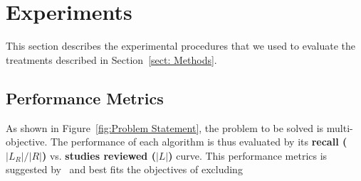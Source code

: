 \documentclass{svjour3}
\theoremstyle{break}
\begin{document}
\section{Experiments}
\label{sect: Experiments}

This section describes the experimental procedures that we used to evaluate the treatments described in Section~\ref{sect: Methods}. 

\subsection{Performance Metrics}
\label{sect: Performance Metrics}

As shown in Figure~\ref{fig:Problem Statement}, the problem to be solved is multi-objective. The performance of each algorithm is thus evaluated by its \textbf{recall ($|L_R|/|R|$)} vs. \textbf{studies reviewed ($|L|$)} curve. This performance metrics is suggested by~\cite{cormack2015autonomy,cormack2014evaluation,tredennick2015} and best fits the objectives of excluding 
\end{document}

